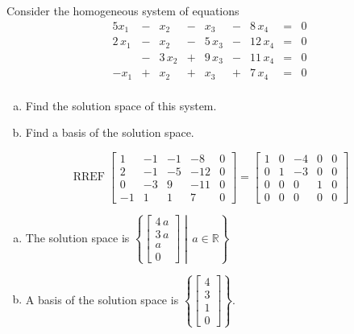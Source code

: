 
\begin{exerciseStatement}


Consider the homogeneous system of equations 
\begin{alignat*}{5} x_{1} &-& x_{2} &-& x_{3} &-& 8 \, x_{4} &=& 0 \\2 \, x_{1} &-& x_{2} &-& 5 \, x_{3} &-& 12 \, x_{4} &=& 0 \\ &-& 3 \, x_{2} &+& 9 \, x_{3} &-& 11 \, x_{4} &=& 0 \\-x_{1} &+& x_{2} &+& x_{3} &+& 7 \, x_{4} &=& 0 \\ \end{alignat*}
            


\begin{enumerate}[(a)]
\item  Find the solution space of this system.
\item  Find a basis of the solution space.
\end{enumerate}
    
\end{exerciseStatement}
    
\begin{exerciseAnswer} 


\[\operatorname{RREF} \left[\begin{array}{cccc|c}
1 & -1 & -1 & -8 & 0 \\
2 & -1 & -5 & -12 & 0 \\
0 & -3 & 9 & -11 & 0 \\
-1 & 1 & 1 & 7 & 0
\end{array}\right] = \left[\begin{array}{cccc|c}
1 & 0 & -4 & 0 & 0 \\
0 & 1 & -3 & 0 & 0 \\
0 & 0 & 0 & 1 & 0 \\
0 & 0 & 0 & 0 & 0
\end{array}\right] \]


\begin{enumerate}[(a)]
\item The solution space is \( \left\{ \left[\begin{array}{c}
4 \, a \\
3 \, a \\
a \\
0
\end{array}\right] \middle|\,a\in\mathbb{R}\right\} \)
\item A basis of the solution space is \( \left\{ \left[\begin{array}{c}
4 \\
3 \\
1 \\
0
\end{array}\right] \right\} \).
\end{enumerate}
    
\end{exerciseAnswer}
    
